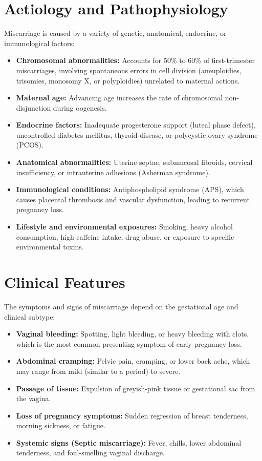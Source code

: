 \section*{Aetiology and Pathophysiology}
Miscarriage is caused by a variety of genetic, anatomical, endocrine, or immunological factors:
\begin{itemize}
    \item \textbf{Chromosomal abnormalities:} Accounts for 50\% to 60\% of first-trimester miscarriages, involving spontaneous errors in cell division (aneuploidies, trisomies, monosomy X, or polyploidies) unrelated to maternal actions.
    \item \textbf{Maternal age:} Advancing age increases the rate of chromosomal non-disjunction during oogenesis.
    \item \textbf{Endocrine factors:} Inadequate progesterone support (luteal phase defect), uncontrolled diabetes mellitus, thyroid disease, or polycystic ovary syndrome (PCOS).
    \item \textbf{Anatomical abnormalities:} Uterine septae, submucosal fibroids, cervical insufficiency, or intrauterine adhesions (Asherman syndrome).
    \item \textbf{Immunological conditions:} Antiphospholipid syndrome (APS), which causes placental thrombosis and vascular dysfunction, leading to recurrent pregnancy loss.
    \item \textbf{Lifestyle and environmental exposures:} Smoking, heavy alcohol consumption, high caffeine intake, drug abuse, or exposure to specific environmental toxins.
\end{itemize}

\section*{Clinical Features}
The symptoms and signs of miscarriage depend on the gestational age and clinical subtype:
\begin{itemize}
    \item \textbf{Vaginal bleeding:} Spotting, light bleeding, or heavy bleeding with clots, which is the most common presenting symptom of early pregnancy loss.
    \item \textbf{Abdominal cramping:} Pelvic pain, cramping, or lower back ache, which may range from mild (similar to a period) to severe.
    \item \textbf{Passage of tissue:} Expulsion of greyish-pink tissue or gestational sac from the vagina.
    \item \textbf{Loss of pregnancy symptoms:} Sudden regression of breast tenderness, morning sickness, or fatigue.
    \item \textbf{Systemic signs (Septic miscarriage):} Fever, chills, lower abdominal tenderness, and foul-smelling vaginal discharge.
\end{itemize}

